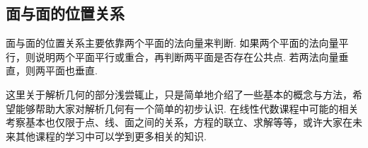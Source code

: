 \subsection{面与面的位置关系}

面与面的位置关系主要依靠两个平面的法向量来判断. 如果两个平面的法向量平行，则说明两个平面平行或重合，再判断两平面是否存在公共点. 若两法向量垂直，则两平面也垂直.

\begin{summary}

    这里关于解析几何的部分浅尝辄止，只是简单地介绍了一些基本的概念与方法，希望能够帮助大家对解析几何有一个简单的初步认识. 在线性代数课程中可能的相关考察基本也仅限于点、线、面之间的关系，方程的联立、求解等等，或许大家在未来其他课程的学习中可以学到更多相关的知识.

\end{summary}

\begin{exercise}

    \begin{exgroup}
        \item
    \end{exgroup}

    \begin{exgroup}
        \item
    \end{exgroup}

    \begin{exgroup}
        \item
    \end{exgroup}
\end{exercise}
